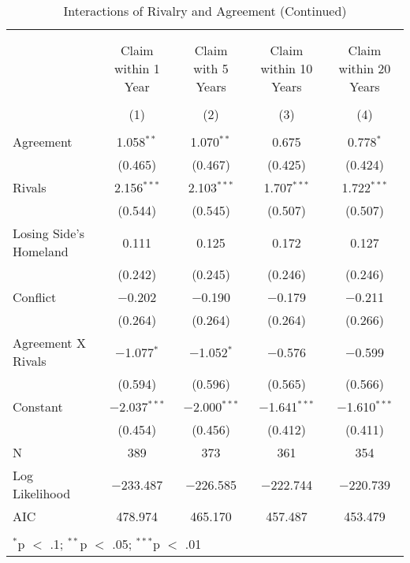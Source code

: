 \documentclass{article}
\begin{document}
\begin{table}[!htbp] \centering 
  \caption{Interactions of Rivalry and Agreement (Continued)} 
  \label{} 
\begin{tabular}{@{\extracolsep{5pt}}lcccc} 
\\[-1.8ex]\hline \\[-1.8ex] 
\\[-1.8ex] & Claim within 1 Year & Claim with 5 Years & Claim within 10 Years & Claim within 20 Years \\ 
\\[-1.8ex] & (1) & (2) & (3) & (4)\\ 
\hline \\[-1.8ex] 
 Agreement & 1.058$^{**}$ & 1.070$^{**}$ & 0.675 & 0.778$^{*}$ \\ 
  & (0.465) & (0.467) & (0.425) & (0.424) \\ 
  Rivals & 2.156$^{***}$ & 2.103$^{***}$ & 1.707$^{***}$ & 1.722$^{***}$ \\ 
  & (0.544) & (0.545) & (0.507) & (0.507) \\ 
  Losing Side's Homeland & 0.111 & 0.125 & 0.172 & 0.127 \\ 
  & (0.242) & (0.245) & (0.246) & (0.246) \\ 
  Conflict & $-$0.202 & $-$0.190 & $-$0.179 & $-$0.211 \\ 
  & (0.264) & (0.264) & (0.264) & (0.266) \\ 
  Agreement X Rivals & $-$1.077$^{*}$ & $-$1.052$^{*}$ & $-$0.576 & $-$0.599 \\ 
  & (0.594) & (0.596) & (0.565) & (0.566) \\ 
  Constant & $-$2.037$^{***}$ & $-$2.000$^{***}$ & $-$1.641$^{***}$ & $-$1.610$^{***}$ \\ 
  & (0.454) & (0.456) & (0.412) & (0.411) \\ 
 N & 389 & 373 & 361 & 354 \\ 
Log Likelihood & $-$233.487 & $-$226.585 & $-$222.744 & $-$220.739 \\ 
AIC & 478.974 & 465.170 & 457.487 & 453.479 \\ 
\hline \\[-1.8ex] 
\multicolumn{5}{l}{$^{*}$p $<$ .1; $^{**}$p $<$ .05; $^{***}$p $<$ .01} \\ 
\end{tabular} 
\end{table} 
\end{document}
